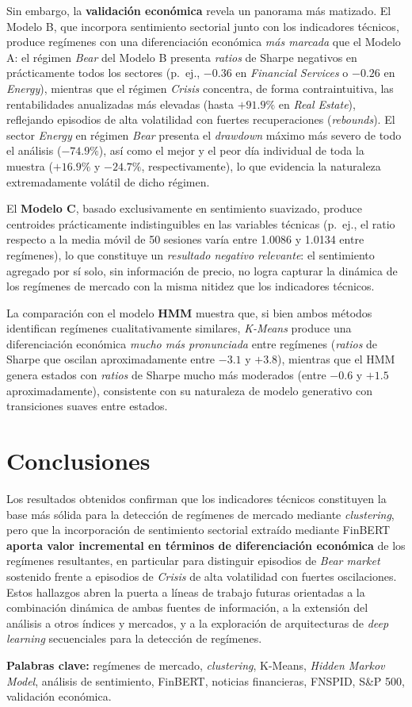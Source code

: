 Sin embargo, la \textbf{validación económica} revela un panorama más
matizado. El Modelo B, que incorpora sentimiento sectorial junto con los
indicadores técnicos, produce regímenes con una diferenciación económica
\emph{más marcada} que el Modelo A: el régimen \emph{Bear} del Modelo B
presenta \textit{ratios} de Sharpe negativos en prácticamente todos los
sectores (p.\ ej., $-0.36$ en \textit{Financial Services} o $-0.26$ en
\textit{Energy}), mientras que el régimen \emph{Crisis} concentra, de
forma contraintuitiva, las rentabilidades anualizadas más elevadas (hasta
$+91.9\%$ en \textit{Real Estate}), reflejando episodios de alta
volatilidad con fuertes recuperaciones (\textit{rebounds}). El sector
\textit{Energy} en régimen \emph{Bear} presenta el \textit{drawdown}
máximo más severo de todo el análisis ($-74.9\%$), así como el mejor y el
peor día individual de toda la muestra ($+16.9\%$ y $-24.7\%$,
respectivamente), lo que evidencia la naturaleza extremadamente volátil
de dicho régimen.

El \textbf{Modelo C}, basado exclusivamente en sentimiento suavizado,
produce centroides prácticamente indistinguibles en las variables
técnicas (p.\ ej., el ratio respecto a la media móvil de 50 sesiones varía
entre 1.0086 y 1.0134 entre regímenes), lo que constituye un
\emph{resultado negativo relevante}: el sentimiento agregado por sí solo,
sin información de precio, no logra capturar la dinámica de los regímenes
de mercado con la misma nitidez que los indicadores técnicos.

La comparación con el modelo \textbf{HMM} muestra que, si bien ambos
métodos identifican regímenes cualitativamente similares, \textit{K-Means}
produce una diferenciación económica \emph{mucho más pronunciada} entre
regímenes (\textit{ratios} de Sharpe que oscilan aproximadamente entre
$-3.1$ y $+3.8$), mientras que el HMM genera estados con \textit{ratios}
de Sharpe mucho más moderados (entre $-0.6$ y $+1.5$ aproximadamente),
consistente con su naturaleza de modelo generativo con transiciones
suaves entre estados.

\section*{Conclusiones}

Los resultados obtenidos confirman que los indicadores técnicos
constituyen la base más sólida para la detección de regímenes de mercado
mediante \textit{clustering}, pero que la incorporación de sentimiento
sectorial extraído mediante FinBERT \textbf{aporta valor incremental en
términos de diferenciación económica} de los regímenes resultantes, en
particular para distinguir episodios de \emph{Bear market} sostenido
frente a episodios de \emph{Crisis} de alta volatilidad con fuertes
oscilaciones. Estos hallazgos abren la puerta a líneas de trabajo futuras
orientadas a la combinación dinámica de ambas fuentes de información, a
la extensión del análisis a otros índices y mercados, y a la exploración
de arquitecturas de \textit{deep learning} secuenciales para la detección
de regímenes.

\vspace{1cm}
\noindent\textbf{Palabras clave:} regímenes de mercado, \textit{clustering},
K-Means, \textit{Hidden Markov Model}, análisis de sentimiento, FinBERT,
noticias financieras, FNSPID, S\&P 500, validación económica.

\clearpage
